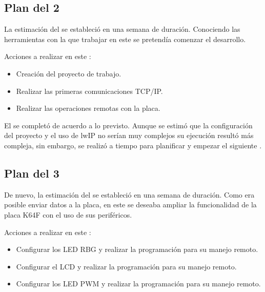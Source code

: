 \clearpage

\subsection{Plan del  2} \label{sec:plan-s2}
La estimación del  se estableció en una semana de
duración. Conociendo las herramientas con la que trabajar en este
 se pretendía comenzar el desarrollo. 

Acciones a realizar en este :
\begin{itemize}
  \item Creación del proyecto de trabajo.
  \item Realizar las primeras comunicaciones TCP/IP.  
  \item Realizar las operaciones remotas con la placa.
\end{itemize}


El  se completó de acuerdo a lo previsto. Aunque se 
estimó que la configuración del proyecto y el uso de lwIP no serían muy
complejos su ejecución resultó más compleja, sin embargo, se realizó a tiempo
para planificar y empezar el siguiente .

\clearpage

\subsection{Plan del  3} \label{sec:plan-s3}
De nuevo, la estimación del  se estableció en una semana
de duración. Como era posible enviar datos a la placa, en este
 se deseaba ampliar la funcionalidad de la placa K64F
con el uso de sus periféricos.

Acciones a realizar en este :
\begin{itemize}
  \item Configurar los LED RBG y realizar la programación para su manejo remoto.
  \item Configurar el LCD y realizar la programación para su manejo remoto. 
  \item Configurar los LED PWM y realizar la programación para su manejo remoto.
\end{itemize}


